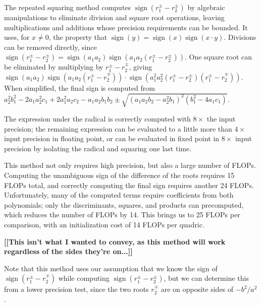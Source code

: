 \documentclass{cccg16}
\DeclareMathOperator{\sign}{sign}
\def\Michael#1{{\bf \color{red} [[#1]]}\ignorespaces}
\begin{document}
The repeated squaring method computes $\sign(r_1^\pm-r_2^\pm)$ by algebraic
manipulations to eliminate division and square root
operations, leaving multiplications and additions whose precision requirements can be bounded. 
It uses, for $x\ne 0$,  the property that $\sign(y)=\sign(x)\sign(x\cdot y)$.   
Divisions can be removed directly, since 
 $\sign(r_1^\pm-r_2^\pm)=\sign(a_1 a_2)\sign(a_1 a_2 (r_1^\pm-r_2^\pm))$.  One 
square root can be eliminated by multiplying by $r_1^\pm-r_2^\mp$,
giving~$\sign(a_1 a_2)\sign(a_1 a_2
(r_1^\pm-r_2^\mp))\cdot\sign(a_1^2 a_2^2 (r_1^\pm - r_2^\pm) (r_1^\pm -
r_2^\mp))$.  When simplified, the final sign is computed
from~$a_2^2b_1^2-2a_1a_2^2c_1+2a_1^2a_2c_2-a_1a_2b_1b_2\pm
\sqrt{(a_1a_2b_2-a_2^2b_1)^2(b_1^2-4a_1c_1)}$.   

The expression under the radical is correctly computed with $8\times$
the input precision; the remaining expression can be evaluated to a
little more than $4\times$ input precision in floating point, or can
be evaluated in fixed point in $8\times$ input precision by isolating
the radical and squaring one last time.

This method not only requires high precision, but also a large number
of FLOPs.  Computing the unambiguous sign of the difference of the
roots requires 15 FLOPs total, and correctly computing the final sign
requires another 24 FLOPs.  Unfortunately, many of the computed terms
require coefficients from both polynomials; only the discriminants,
squares, and products can precomputed, which reduces the number of
FLOPs by 14.  This brings us to 25 FLOPs per comparison, with an
initialization cost of 14 FLOPs per quadric.

\Michael{This isn't what I wanted to convey, as this method will work
  regardless of the sides they're on...}

Note that this method uses our assumption that we know the sign of
$\sign(r_1^\pm-r_2^\mp)$ while computing $\sign(r_1^\pm-r_2^\pm)$, but
we can determine this from a lower precision test, since the two roots
$r_2^\mp$ are on opposite sides of $-b^2/a^2$.
\end{document}
